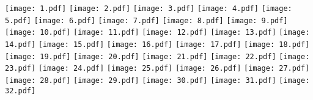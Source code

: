 \documentclass[letter,12pt]{article}
\begin{document}
\noindent \texttt{[image: 1.pdf]}  
\texttt{[image: 2.pdf]}  %
\texttt{[image: 3.pdf]}  %
\texttt{[image: 4.pdf]}  %
\texttt{[image: 5.pdf]}  %
\texttt{[image: 6.pdf]}  %
\texttt{[image: 7.pdf]}  %
\texttt{[image: 8.pdf]}  %
\texttt{[image: 9.pdf]}  %
\texttt{[image: 10.pdf]} %
\texttt{[image: 11.pdf]} %
\texttt{[image: 12.pdf]} %
\texttt{[image: 13.pdf]} %
\texttt{[image: 14.pdf]} %
\texttt{[image: 15.pdf]} %
\texttt{[image: 16.pdf]} %
\texttt{[image: 17.pdf]} %
\texttt{[image: 18.pdf]} %
\texttt{[image: 19.pdf]} %
\texttt{[image: 20.pdf]} %
\texttt{[image: 21.pdf]} %
\texttt{[image: 22.pdf]} %
\texttt{[image: 23.pdf]} %
\texttt{[image: 24.pdf]} %
\texttt{[image: 25.pdf]} %
\texttt{[image: 26.pdf]} %
\texttt{[image: 27.pdf]} %
\texttt{[image: 28.pdf]} %
\texttt{[image: 29.pdf]} %
\texttt{[image: 30.pdf]} %
\texttt{[image: 31.pdf]} %
\texttt{[image: 32.pdf]} \\
\end{document}
